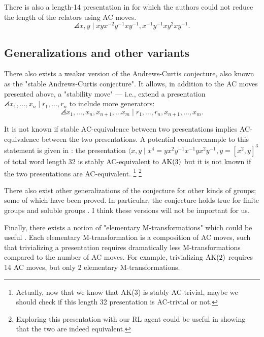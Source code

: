 There is also a length-14 presentation in \cite{MMS} for which the authors could not reduce the length of the relators using AC moves.
\[
\angles{x, y \mid xyx^{-2}y^{-1} xy^{-1}, x^{-1} y^{-1} x y^2 x y^{-1}}.
\]

\subsection{Generalizations and other variants}

There also exists a weaker version of the Andrews-Curtis conjecture, also known as the "stable Andrews-Curtis conjecture".
It allows, in addition to the AC moves presented above, a "stability move" --- i.e., extend a presentation $\angles{x_1, \dots, x_n \mid r_1, \dots, r_n}$ to include more generators:
\[
\angles{x_1, \dots, x_n, x_{n+1}, \dots x_m \mid r_1, \dots, r_n, x_{n+1}, \dots, x_m}.
\]

It is not known if stable AC-equivalence between two presentations implies AC-equivalence between the two presentations.
A potential counterexample to this statement is given in \cite{MMS}: the presentation $\langle x, y \mid x^4 = y x^2 y^{-1} x^{-1} y x^2 y^{-1}, y = [x^2, y]^3 $ of total word length 32 is stably AC-equivalent to $\text{AK}(3)$ but it is not known if the two presentations are AC-equivalent.
\footnote{Actually, now that we know that AK(3) is stably AC-trivial, maybe we should check if this length 32 presentation is AC-trivial or not.}
\footnote{Exploring this presentation with our RL agent could be useful in showing that the two are indeed equivalent.}
\newline

There also exist other generalizations of the conjecture for other kinds of groups; some of which have been proved.
In particular, the conjecture holds true for finite groups and soluble groups \cite{Borovik, Guyot}.
I think these versions will not be important for us.
\newline

Finally, there exists a notion of "elementary M-transformations" which could be useful \cite{BurnsI, BurnsII}.
Each elementary M-transformation is a composition of AC moves, such that trivializing a presentation requires dramatically less M-transformations compared to the number of AC moves.
For example, trivializing $\text{AK}(2)$ requires 14 AC moves, but only 2 elementary M-transformations.